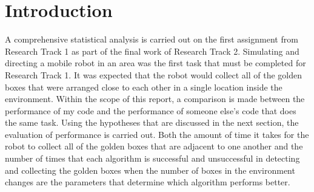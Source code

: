 \section{Introduction}\label{P1}
A comprehensive statistical analysis is carried out on the first assignment 
from Research Track 1 as part of the final work of Research Track 2. 
Simulating and directing a mobile robot in an area was the first task that must be completed 
for Research Track 1. It was expected that the robot would collect all of the golden boxes 
that were arranged close to each other in a single location inside the environment. 
Within the scope of this report, a comparison is made between the performance of my code 
and the performance of someone else's code that does the same task. 
Using the hypotheses that are discussed in the next section, 
the evaluation of performance is carried out. Both the amount of time it takes for 
the robot to collect all of the golden boxes that are adjacent to one another and 
the number of times that each algorithm is successful and unsuccessful in detecting and 
collecting the golden boxes when the number of boxes in the environment changes are 
the parameters that determine which algorithm performs better.

\newpage